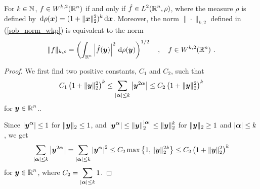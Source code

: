 \begin{theorem} \label{sob_wk2_wk2}
For $k\in \mathbb{N}$, $\displaystyle f \in W^{k,2}(\mathbb{R}^n)$ if and only if
$\displaystyle \hat{f} \in L^2(\mathbb{R}^n,\rho)$, where the measure $\rho$
is defined by
$\displaystyle \,\mathrm{d}{\rho({\bm{x}})} = (1+\|{\bm{x}}\|_2^2)^k\,\mathrm{d}{{\bm{x}}}$.
Moreover, the norm $\|\cdot \|_{k,2}$ defined in (\ref{sob_norm_wkp})
is equivalent to the norm
\begin{equation} \label{sob_norm_wkmu}
\|f \|_{k,\rho} = \left( \int_{\RR^n} \left| \hat{f}(\VEC{y})\right|^2
\dx{\rho(\VEC{y})} \right)^{1/2} \quad , \quad f \in W^{k,2}(\RR^n) \ .
\end{equation}
\end{theorem}

\begin{proof}
 We first find two positive constants,
$C_1$ and $C_2$, such that
\[
C_1 \left( 1 + \|{\bm{y}}\|_2^2\right)^k \leq
\sum_{|{\bm{\alpha}}|\leq k} \left|{\bm{y}}^{2{\bm{\alpha}}}\right| \leq
C_2 \left( 1 + \|{\bm{y}}\|_2^2\right)^k
\]
for $\displaystyle {\bm{y}} \in \mathbb{R}^n$..

 Since
$\displaystyle \left| {\bm{y}}^{{\bm{\alpha}}} \right| \leq 1$
for $\|{\bm{y}}\|_2 \leq 1$, and
$\displaystyle \left| {\bm{y}}^{{\bm{\alpha}}} \right| \leq
\|{\bm{y}}\|_2^{|{\bm{\alpha}}|} \leq \|{\bm{y}}\|_2^{k}$
for $\|{\bm{y}}\|_2 \geq 1$ and $|{\bm{\alpha}}|\leq k$, we get
\[
\sum_{|{\bm{\alpha}}|\leq k} \left|{\bm{y}}^{2{\bm{\alpha}}}\right| 
= \sum_{|{\bm{\alpha}}|\leq k} \left|{\bm{y}}^{{\bm{\alpha}}}\right|^2 \leq
C_2 \max\left\{ 1, \|{\bm{y}}\|_2^{2k} \right\}
\leq C_2 \left( 1 + \|{\bm{y}}\|_2^2\right)^k
\]
for $\displaystyle {\bm{y}} \in \mathbb{R}^n$, where
$\displaystyle C_2 = \sum_{|{\bm{\alpha}}|\leq k} 1$.


\end{proof}
